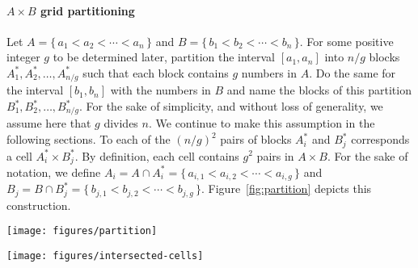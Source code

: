 \paragraph{$A \times B$ grid partitioning}
Let $A = \{\,a_1<a_2<\cdots<a_n\,\}$ and $B = \{\,b_1<b_2<\cdots<b_n\,\}$.
For some positive integer $g$ to be determined later, partition the interval
\([a_1,a_n]\) into \(n/g\)
blocks $A_1^*,A_2^*,\ldots,A_{n/g}^*$ such that each block
contains \(g\) numbers in \(A\). Do the same for the interval
\([b_1,b_n]\) with the numbers in \(B\) and name the blocks of this
partition $B_1^*,B_2^*,\ldots,B_{n/g}^*$.
For the sake of simplicity, and without loss of generality, we assume
here that $g$ divides $n$.  We continue to make this assumption in the
following sections.
To each of the \({ ( n/g ) }^2\) pairs of blocks $A_i^*$ and $B_j^*$
corresponds a cell $A_i^* \times B_j^*$.
By definition, each cell contains $g^2$ pairs in \(A \times
B\).
For the sake of notation,
we define
$A_i = A \cap A_i^* = \{\,a_{i,1} < a_{i,2} < \cdots < a_{i,g}\,\}$
and
$B_j = B \cap B_j^* = \{\,b_{j,1} < b_{j,2} < \cdots < b_{j,g}\,\}$.
Figure~\ref{fig:partition} depicts this construction.

\begin{figure*}
\centering
    \texttt{[image: figures/partition]}
    \caption{The partitioning of \(A \times B\). There are \( n/g \) columns \( A_i^*
    \), \( n/g \) rows \( B_j^* \), and \( {(n/g)}^2 \) cells \( A_i^* \times
    B_j^* \). There are \( n^2 \) points in \( A \times B \).
    Each column contains the \( ng \) points in \( A_i \times B \), each row contains
    the \( ng \) points in \( A \times B_j \), and each cell contains the \(
    g^{2} \) points in \( A_i \times B_j \).}%
    \label{fig:partition}
\end{figure*}
\begin{figure*}
\centering
    \texttt{[image: figures/intersected-cells]}
    \caption{An $xy$-monotone arc of the two-dimensional polynomial curve of
    equation $c=f(x,y)$. This arc intersects a staircase of at most $2
    \frac ng - 1$ cells in the grid. When $f$ has constant degree, the defined
    curve can be partitioned into $O(1)$ such arcs.}%
    \label{fig:intersected-cells}
\end{figure*}

